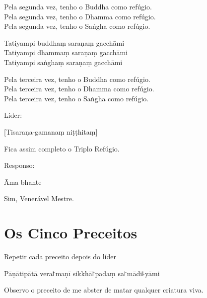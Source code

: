 \documentclass[
  babelLanguage=portuguese,
  final,
]{chantingbook}
\begin{document}
\begin{english}
  Pela segunda vez, tenho o Buddha como refúgio.\\
  Pela segunda vez, tenho o Dhamma como refúgio.\\
  Pela segunda vez, tenho o Saṅgha como refúgio.
\end{english}

Tatiyampi buddhaṃ saraṇaṃ gacchāmi\\
Tatiyampi dhammaṃ saraṇaṃ gacchāmi\\
Tatiyampi saṅghaṃ saraṇaṃ gacchāmi

\clearpage

\begin{english}
  Pela terceira vez, tenho o Buddha como refúgio.\\
  Pela terceira vez, tenho o Dhamma como refúgio.\\
  Pela terceira vez, tenho o Saṅgha como refúgio.
\end{english}

\begin{instruction}
  Líder:
\end{instruction}

[Tisaraṇa-gamanaṃ niṭṭhitaṃ]

\begin{english}
  Fica assim completo o Triplo Refúgio.
\end{english}

\begin{instruction}
  Responso:
\end{instruction}

Āma bhante

\begin{english}
  Sim, Venerável Mestre.
\end{english}

\chapter{Os Cinco Preceitos}

\begin{instruction}
  Repetir cada preceito depois do líder
\end{instruction}

\begin{precept}
  \setcounter{enumi}{0}
  \item Pāṇātipātā vera꜓maṇī sikkhā꜓padaṃ sa꜓mādi꜕yāmi
\end{precept}

\begin{english}
  Observo o preceito de me abster de matar qualquer criatura viva.
\end{english}
\end{document}
